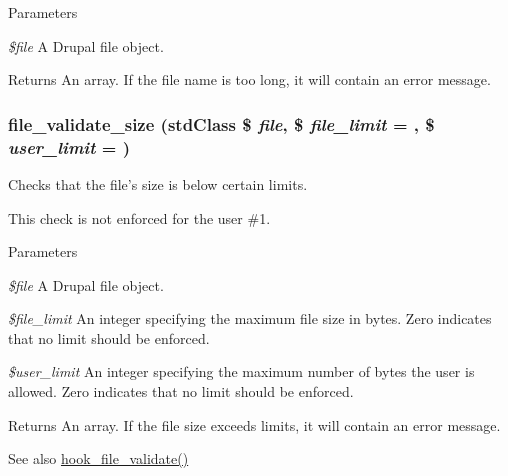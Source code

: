 \begin{DoxyParams}{Parameters}
\item[{\em \$file}]A Drupal file object.\end{DoxyParams}
\begin{DoxyReturn}{Returns}
An array. If the file name is too long, it will contain an error message. 
\end{DoxyReturn}
\hypertarget{group__file_gad5dc623436b94f82d7a110adf8590915}{
\subsubsection[{file\_\-validate\_\-size}]{\setlength{\rightskip}{0pt plus 5cm}file\_\-validate\_\-size (stdClass \$ {\em file}, \/  \$ {\em file\_\-limit} = {}, \/  \$ {\em user\_\-limit} = {})}}
\label{group__file_gad5dc623436b94f82d7a110adf8590915}
Checks that the file's size is below certain limits.

This check is not enforced for the user \#1.


\begin{DoxyParams}{Parameters}
\item[{\em \$file}]A Drupal file object. \item[{\em \$file\_\-limit}]An integer specifying the maximum file size in bytes. Zero indicates that no limit should be enforced. \item[{\em \$user\_\-limit}]An integer specifying the maximum number of bytes the user is allowed. Zero indicates that no limit should be enforced.\end{DoxyParams}
\begin{DoxyReturn}{Returns}
An array. If the file size exceeds limits, it will contain an error message.
\end{DoxyReturn}
\begin{DoxySeeAlso}{See also}
\hyperlink{group__hooks_gab1491b52a117229913448d787156e013}{hook\_\-file\_\-validate()} 
\end{DoxySeeAlso}
